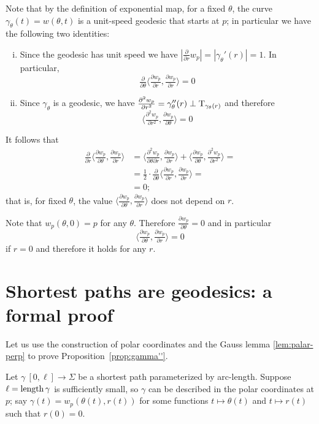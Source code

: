 Note that by the definition of exponential map, for a fixed $\theta$, the curve $\gamma_\theta(t)=w(\theta,t)$ is a unit-speed geodesic that starts at $p$;
in particular we have the following two identities:
\begin{enumerate}[(i)]
\item Since the geodesic has unit speed we have $|\tfrac{\partial}{\partial r}w_p|=|\gamma_\theta'(r)|=1$.
In particular,
 \[\tfrac{\partial}{\partial \theta}\langle\tfrac{\partial w_p}{\partial r},\tfrac{\partial w_p}{\partial r}\rangle=0\]
\item Since $\gamma_\theta$ is a geodesic, we have $\tfrac{\partial^2w_p}{\partial r^2}=\gamma''_\theta(r)\perp\mathrm{T}_{\gamma_\theta(r)}$ and therefore 
\[\langle\tfrac{\partial^2w_p}{\partial r^2},\tfrac{\partial w_p}{\partial \theta}\rangle=0\]
\end{enumerate}
It follows that
\begin{align*}
\tfrac{\partial}{\partial r}
\langle\tfrac{\partial w_p}{\partial\theta},\tfrac{\partial w_p}{\partial r}\rangle
&=\langle\tfrac{\partial^2 w_p}{\partial\theta\partial r},\tfrac{\partial w_p}{\partial r}\rangle
+
\langle\tfrac{\partial w_p}{\partial\theta},\tfrac{\partial^2 w_p}{\partial r^2}\rangle=
\\
&=\tfrac12\cdot \tfrac{\partial}{\partial \theta}\langle\tfrac{\partial w_p}{\partial r},\tfrac{\partial w_p}{\partial r}\rangle=
\\
&=0;
\end{align*}
that is, for fixed $\theta$, the value $\langle\tfrac{\partial w_p}{\partial\theta},\tfrac{\partial w_p}{\partial r}\rangle$ does not depend on $r$.

Note that $w_p(\theta,0)=p$ for any $\theta$.
Therefore
$\tfrac{\partial w_p}{\partial\theta}=0$
and in particular 
\[\langle\tfrac{\partial w_p}{\partial\theta},\tfrac{\partial w_p}{\partial r}\rangle=0\]
if $r=0$ and therefore it holds for any $r$.
\qeds

\section*{Shortest paths are geodesics: a formal proof}

Let us use the construction of polar coordinates and the Gauss lemma \ref{lem:palar-perp} to prove Proposition~\ref{prop:gamma''}.

\label{page:proof-of-gamma''}
Let $\gamma\:[0,\ell]\to\Sigma$ be a shortest path parameterized by arc-length.
Suppose $\ell=\mathop{\rm length}\nolimits\gamma$ is sufficiently small, so $\gamma$ can be described in the polar coordinates at $p$;
say $\gamma(t)=w_p(\theta(t),r(t))$ for some functions $t\mapsto \theta(t)$ and $t\mapsto r(t)$ such that $r(0)=0$. %

